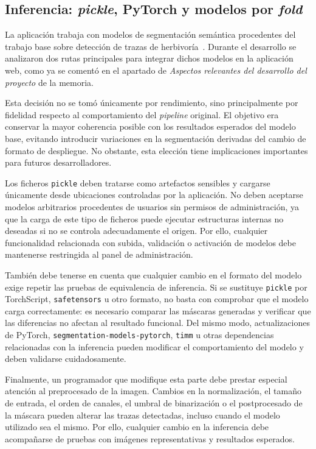 \subsection{Inferencia: \textit{pickle}, PyTorch y modelos por \textit{fold}} 

La aplicación trabaja con modelos de segmentación semántica procedentes del trabajo base sobre detección de trazas de herbivoría~\cite{diezpastora2025trails}. Durante el desarrollo se analizaron dos rutas principales para integrar dichos modelos en la aplicación web, como ya se comentó en el apartado de \textit{Aspectos relevantes del desarrollo del proyecto} de la memoria.

Esta decisión no se tomó únicamente por rendimiento, sino principalmente por fidelidad respecto al comportamiento del \textit{pipeline} original. El objetivo era conservar la mayor coherencia posible con los resultados esperados del modelo base, evitando introducir variaciones en la segmentación derivadas del cambio de formato de despliegue. No obstante, esta elección tiene implicaciones importantes para futuros desarrolladores.

Los ficheros \texttt{pickle} deben tratarse como artefactos sensibles y cargarse únicamente desde ubicaciones controladas por la aplicación. No deben aceptarse modelos arbitrarios procedentes de usuarios sin permisos de administración, ya que la carga de este tipo de ficheros puede ejecutar estructuras internas no deseadas si no se controla adecuadamente el origen. Por ello, cualquier funcionalidad relacionada con subida, validación o activación de modelos debe mantenerse restringida al panel de administración. 

También debe tenerse en cuenta que cualquier cambio en el formato del modelo exige repetir las pruebas de equivalencia de inferencia. Si se sustituye \texttt{pickle} por TorchScript, \texttt{safetensors} u otro formato, no basta con comprobar que el modelo carga correctamente: es necesario comparar las máscaras generadas y verificar que las diferencias no afectan al resultado funcional. Del mismo modo, actualizaciones de PyTorch, \texttt{segmentation-models-pytorch}, \texttt{timm} u otras dependencias relacionadas con la inferencia pueden modificar el comportamiento del modelo y deben validarse cuidadosamente. 

Finalmente, un programador que modifique esta parte debe prestar especial atención al preprocesado de la imagen. Cambios en la normalización, el tamaño de entrada, el orden de canales, el umbral de binarización o el postprocesado de la máscara pueden alterar las trazas detectadas, incluso cuando el modelo utilizado sea el mismo. Por ello, cualquier cambio en la inferencia debe acompañarse de pruebas con imágenes representativas y resultados esperados.

